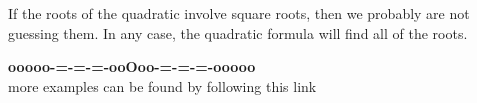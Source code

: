 \documentclass{ximera}
\begin{document}
If the roots of the quadratic involve square roots, then we probably are not guessing them.  In any case, the quadratic formula will find all of the roots.
























\begin{center}
\textbf{\textcolor{green!50!black}{ooooo-=-=-=-ooOoo-=-=-=-ooooo}} \\

more examples can be found by following this link\\ 

\end{center}
\end{document}
